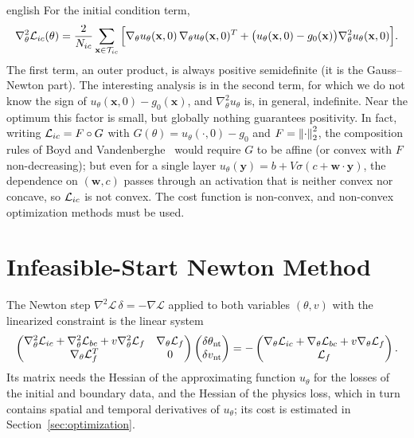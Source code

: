 \documentclass[../0000.tex]{subfiles}
\begin{document}
\begin{hyphenrules}{english}
For the initial condition term,
\begin{equation}
  \nabla^2_\theta\mathcal{L}_{ic}(\theta)=\frac{2}{N_{ic}}\sum_{\mathbf{x}\in\mathcal{T}_{ic}}
  \Big[\nabla_\theta u_\theta(\mathbf{x},0)\,\nabla_\theta u_\theta(\mathbf{x},0)^{T}
  +\big(u_\theta(\mathbf{x},0)-g_0(\mathbf{x})\big)\nabla^2_\theta u_\theta(\mathbf{x},0)\Big].
  \label{eq:hessian-ic}
\end{equation}
The first term, an outer product, is always positive semidefinite (it is the Gauss--Newton part). The
interesting analysis is in the second term, for which we do not know the sign of
$u_\theta(\mathbf{x},0)-g_0(\mathbf{x})$, and $\nabla^2_\theta u_\theta$ is, in general, indefinite. Near the optimum this
factor is small, but globally nothing guarantees positivity. In fact, writing $\mathcal{L}_{ic}=F\circ G$ with
$G(\theta)=u_\theta(\cdot,0)-g_0$ and $F=\left\lVert \cdot \right\rVert_2^2$, the composition rules of
Boyd and Vandenberghe~\cite{boyd2004} would require $G$ to be affine (or convex with $F$ non-decreasing); but even for a
single layer $u_\theta(\mathbf{y})=b+V\sigma(c+\mathbf{w}\cdot\mathbf{y})$, the dependence on $(\mathbf{w},c)$ passes
through an activation that is neither convex nor concave, so $\mathcal{L}_{ic}$ is not convex. The cost function
is non-convex, and non-convex optimization methods must be used.

\section{Infeasible-Start Newton Method}\label{app-sec:newton}

The Newton step $\nabla^2\mathscr{L}\,\delta=-\nabla\mathscr{L}$ applied to both variables $(\theta,v)$
with the linearized constraint is the linear system \cite{boyd2004}
\begin{equation}
  \begin{pmatrix}
    \nabla^2_\theta\mathcal{L}_{ic}+\nabla^2_\theta\mathcal{L}_{bc}+v\nabla^2_\theta\mathcal{L}_f & \nabla_\theta\mathcal{L}_f\\
    \nabla_\theta\mathcal{L}_f^{T} & 0
  \end{pmatrix}
  \begin{pmatrix}\delta\theta_{\mathrm{nt}}\\ \delta v_{\mathrm{nt}}\end{pmatrix}
  =-\begin{pmatrix}\nabla_\theta\mathcal{L}_{ic}+\nabla_\theta\mathcal{L}_{bc}+v\nabla_\theta\mathcal{L}_f\\ \mathcal{L}_f\end{pmatrix}.
  \label{eq:newton-system}
\end{equation}
Its matrix needs the Hessian of the approximating function $u_\theta$ for the losses of the initial and
boundary data, and the Hessian of the physics loss, which in turn contains spatial and temporal
derivatives of $u_\theta$; its cost is estimated in Section~\ref{sec:optimization}.


\end{hyphenrules}
\end{document}
